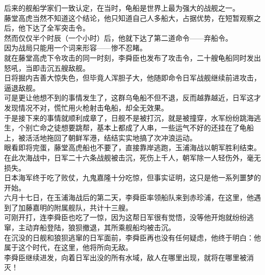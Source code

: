 \begin{multicols}{\theparacolNo}
后来的舰船学家们一致认定，在当时，龟船是世界上最为强大的战舰之一。\\

藤堂高虎当然不知道这个结论，他只知道自己人多船大，占据优势，在短暂观察之后，他下达了全军突击令。\\

然而仅仅半个时辰（一个小时）后，他就下达了第二道命令——弃船令。\\

因为战局只能用一个词来形容——惨不忍睹。\\

就在藤堂高虎下令攻击的同一时刻，李舜臣也发布了攻击令，二十艘龟船同时发出怒吼，当即击沉五艘敌舰。\\

日将掘内吉善大惊失色，但毕竟人浑胆子大，他随即命令日军战舰继续前进攻击，逼退敌舰。\\

可是更让他想不到的事情发生了，这群乌龟船不但不退，反而越靠越近，日军这才发现情况不对，慌忙用火枪射击龟船，却全无效果。\\

于是接下来的事情就顺利成章了，日舰不是被打沉，就是被撞穿，水军纷纷跳海逃生，个别亡命之徒想要跳帮，基本上都成了人串，一些运气不好的还挂在了龟船上，被活活地拖回了朝鲜军港，结结实实地搞了次冲浪运动。\\

眼看即将完蛋，藤堂高虎船也不要了，直接靠岸逃跑，玉浦海战以朝军胜利结束。\\

在此次海战中，日军二十六条战舰被击沉，死伤上千人，朝军除一人轻伤外，毫无损失。\\

日本海军终于吃了败仗，九鬼嘉隆十分吃惊，但事实证明，这只是他一系列噩梦的开始。\\

六月十七日，在玉浦海战后的第二天，李舜臣率领船队来到赤珍浦，在这里，他遇到了加藤嘉明的附属舰队，共计十三艘。\\

可刚开打，连李舜臣也吃了一惊，因为这帮日军很有觉悟，没等他开炮就纷纷逃窜，主动弃船登陆，狼狈撤退，其所乘舰船均被击沉。\\

在沉没的日舰和狼狈逃窜的日军面前，李舜臣再也没有任何疑虑，他终于明白：他属于这个时代，在这里，他将所向无敌。\\

李舜臣继续进发，向着日军出没的所有水域，敌人在哪里出现，就将在哪里被消灭！\\


\end{multicols}
